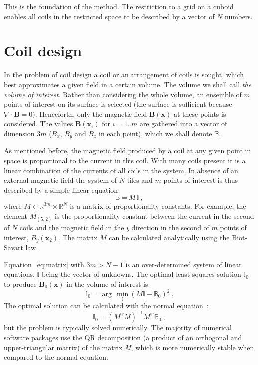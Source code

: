 This is the foundation of the method. The restriction to a grid on a cuboid enables all coils in the restricted space to be described by a vector of $N$ numbers.




\section{Coil design}
In the problem of coil design a coil or an arrangement of coils is sought, which best approximates a given field in a certain volume. The volume we shall call \emph{the volume of interest}. Rather than considering the whole volume, an ensemble of $m$ points of interest on its surface is selected (the surface is sufficient because $\nabla \cdot \mathbf{B} = 0$). Henceforth, only the magnetic field $\mathbf{B}(\mathbf{x})$ at these points is considered. The values $\mathbf{B}(\mathbf{x}_i)$ for $i = 1 .. m$ are gathered into a vector of dimension $3m$ ($B_x$, $B_y$ and $B_z$ in each point), which we shall denote $\mathbb{B}$.

As mentioned before, the magnetic field produced by a coil at any given point in space is proportional to the current in this coil.
With many coils present it is a linear combination of the currents of all coils in the system.
In absence of an external magnetic field the system of $N$ tiles and $m$ points of interest is thus described by a simple linear equation
\begin{equation}
  \label{eq:matrix}
  \mathbb{B} = M \, \mathbb{I}\ ,
\end{equation}
where $M \in \mathbb{R}^{3 m} \times \mathbb{R}^{N}$ is a matrix of proportionality constants.
For example, the element $M_{(5, 2)}$ is the proportionality constant between the current in the second of $N$ coils and the magnetic field in the $y$ direction in the second of $m$ points of interest, $B_y(\mathbf{x}_2)$.
The matrix $M$ can be calculated analytically using the Biot-Savart law.

Equation~\ref{eq:matrix} with $3m > N - 1$ is an over-determined system of linear equations, $\mathbb{I}$ being the vector of unknowns.
The optimal least-squares solution $\mathbb{I}_0$ to produce $\mathbf{B}_0(\mathbf{x})$ in the volume of interest is
\begin{equation}
  \label{eq:requirement}
  \mathbb{I}_0 = \arg\,\min_{\mathbb{I}} {\left( M \mathbb{I} - \mathbb{B}_0 \right)}^2 \ .
\end{equation}
The optimal solution can be calculated with the normal equation~\cite{Anton}:
\begin{equation}
  \mathbb{I}_0 = {\left( M^\mathrm{T} M \right)}^{-1} M^\mathrm{T} \mathbb{B}_0 \ ,
\end{equation}
but the problem is typically solved numerically.
The majority of numerical software packages use the QR decomposition (a product of an orthogonal and upper-triangular matrix) of the matrix $M$, which is more numerically stable when compared to the normal equation.

